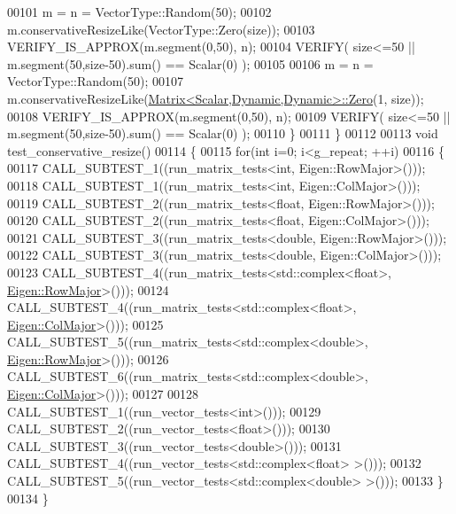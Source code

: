 \begin{DoxyCode}
00101     m = n = VectorType::Random(50);
00102     m.conservativeResizeLike(VectorType::Zero(size));
00103     VERIFY\_IS\_APPROX(m.segment(0,50), n);
00104     VERIFY( size<=50 || m.segment(50,size-50).sum() == Scalar(0) );
00105     
00106     m = n = VectorType::Random(50);
00107     m.conservativeResizeLike(\hyperlink{group___core___module_class_eigen_1_1_matrix}{Matrix<Scalar,Dynamic,Dynamic>::Zero}(1,
      size));
00108     VERIFY\_IS\_APPROX(m.segment(0,50), n);
00109     VERIFY( size<=50 || m.segment(50,size-50).sum() == Scalar(0) );
00110   \}
00111 \}
00112 
00113 \textcolor{keywordtype}{void} test\_conservative\_resize()
00114 \{
00115   \textcolor{keywordflow}{for}(\textcolor{keywordtype}{int} i=0; i<g\_repeat; ++i)
00116   \{
00117     CALL\_SUBTEST\_1((run\_matrix\_tests<int, Eigen::RowMajor>()));
00118     CALL\_SUBTEST\_1((run\_matrix\_tests<int, Eigen::ColMajor>()));
00119     CALL\_SUBTEST\_2((run\_matrix\_tests<float, Eigen::RowMajor>()));
00120     CALL\_SUBTEST\_2((run\_matrix\_tests<float, Eigen::ColMajor>()));
00121     CALL\_SUBTEST\_3((run\_matrix\_tests<double, Eigen::RowMajor>()));
00122     CALL\_SUBTEST\_3((run\_matrix\_tests<double, Eigen::ColMajor>()));
00123     CALL\_SUBTEST\_4((run\_matrix\_tests<std::complex<float>, \hyperlink{group__enums_ggaacded1a18ae58b0f554751f6cdf9eb13acfcde9cd8677c5f7caf6bd603666aae3}{Eigen::RowMajor}>()));
00124     CALL\_SUBTEST\_4((run\_matrix\_tests<std::complex<float>, \hyperlink{group__enums_ggaacded1a18ae58b0f554751f6cdf9eb13a0cbd4bdd0abcfc0224c5fcb5e4f6669a}{Eigen::ColMajor}>()));
00125     CALL\_SUBTEST\_5((run\_matrix\_tests<std::complex<double>, \hyperlink{group__enums_ggaacded1a18ae58b0f554751f6cdf9eb13acfcde9cd8677c5f7caf6bd603666aae3}{Eigen::RowMajor}>()));
00126     CALL\_SUBTEST\_6((run\_matrix\_tests<std::complex<double>, \hyperlink{group__enums_ggaacded1a18ae58b0f554751f6cdf9eb13a0cbd4bdd0abcfc0224c5fcb5e4f6669a}{Eigen::ColMajor}>()));
00127 
00128     CALL\_SUBTEST\_1((run\_vector\_tests<int>()));
00129     CALL\_SUBTEST\_2((run\_vector\_tests<float>()));
00130     CALL\_SUBTEST\_3((run\_vector\_tests<double>()));
00131     CALL\_SUBTEST\_4((run\_vector\_tests<std::complex<float> >()));
00132     CALL\_SUBTEST\_5((run\_vector\_tests<std::complex<double> >()));
00133   \}
00134 \}
\end{DoxyCode}
